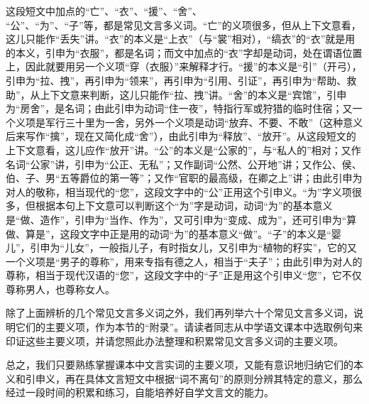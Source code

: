 这段短文中加点的“亡”、“衣”、“援”、“舍”、\\
“公”、“为”、“子”等，都是常见文言多义词。“亡”的义项很多，但从上下文意看，这儿只能作“丢失”讲。“衣”的本义是“上衣”（与“裳”相对），“缟衣”的“衣”就是用的本义，引申为“衣服”，都是名词；而文中加点的“衣”字却是动词，处在谓语位置上，因此就要用另一个义项“穿（衣服）”来解释才行。“援”的本义是“引”（开弓），引申为“拉、拽”，再引申为“领来”，再引申为“引用、引证”，再引申为“帮助、救助”，从上下文意来判断，这儿只能作“拉、拽”讲。“舍”的本义是“宾馆”，引申为“房舍”，是名词；由此引申为动词“住一夜”，特指行军或狩猎的临时住宿；又一个义项是军行三十里为一舍，另外一个义项是动词“放弃、不要、不敢”（这种意义后来写作“擒”，现在又简化成“舍”），由此引申为“释放”、“放开”。从这段短文的上下文意看，这儿应作“放开”讲。“公”的本义是“公家的”，与“私人的”相对；又作名词“公家”讲，引申为“公正、无私”；又作副词“公然、公开地”讲；又作公、侯、伯、子、男“五等爵位的第一等”；又作“官职的最高级，在卿之上”讲；由此引申为对人的敬称，相当现代的“您”，这段文字中的“公”正用这个引申义。“为”字义项很多，但根据本句上下文意可以判断这个“为”字是动词，动词“为”的基本意义是“做、造作”，引申为“当作、作为”，又可引申为“变成、成为”，还可引申为“算做、算是”，这段文字中正是用的动词“为”的基本意义“做”。“子”的本义是“婴儿”，引申为“儿女”，一般指儿子，有时指女儿，又引申为“植物的籽实”，它的又一个义项是“男子的尊称”，用来专指有德之人，相当于“夫子”；由此引申为对人的尊称，相当于现代汉语的“您”，这段文字中的“子”正是用这个引申义“您”，它不仅尊称男人，也尊称女人。

除了上面辨析的几个常见文言多义词之外，我们再列举六十个常见文言多义词，说明它们的主要义项，作为本节的“附录”。请读者同志从中学语文课本中选取例句来印证这些主要义项，并请您照此办法整理和积累常见文言多义词的主要义项。

总之，我们只要熟练掌握课本中文言实词的主要义项，又能有意识地归纳它们的本义和引申义，再在具体文言短文中根据“词不离句”的原则分辨其特定的意义，那么经过一段时间的积累和练习，自能培养好自学文言文的能力。
\newpage